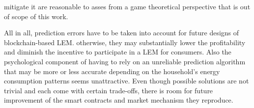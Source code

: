 mitigate it are reasonable to asses from a game theoretical perspective that is out of scope of this work.

All in all, prediction errors have to be taken into account for future designs of blockchain-based LEM. otherwise, they may substantially lower the profitability and diminish the incentive to participate in a LEM for consumers. Also the psychological component of having to rely on an unreliable prediction algorithm that may be more or less accurate depending on the household's energy consumption patterns seems unattractive. Even though possible solutions are not trivial and each come with certain trade-offs, there is room for future improvement of the smart contracts and market mechanism they reproduce.

